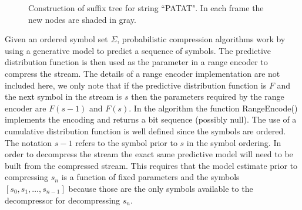 \newcommand{\T}{\ensuremath{\mathcal{T}}}
\newcommand{\N}{\ensuremath{\mathcal{N}}}
\newcommand{\M}{\ensuremath{\mathcal{M}}}
\newcommand{\PP}{\ensuremath{\mathcal{P}}}
\newcommand{\nc}{\ensuremath{nc}}
\newcommand{\RS}{\ensuremath{\mathcal{R}\mathcal{S}}}
\newcommand{\D}{\ensuremath{\mathcal{D}}}
\newcommand{\la}{\ensuremath{\leftarrow}}
\newcommand{\G}{\ensuremath{\mathcal{G}}}
\newcommand{\IS}{\ensuremath{\mathcal{I}\mathcal{S}}}
\newcommand{\Seq}{\ensuremath{\mathcal{S}}}

\begin{figure}[t] 
	\begin{center}
		\caption{Construction of suffix tree for string ``PATAT".  In each frame the new nodes are shaded in gray.}
		\label{fig:suffix_tree}
	\end{center} 
\end{figure} 

Given an ordered symbol set $\Sigma$, probabilistic compression algorithms work by using a generative model to predict a sequence of symbols.   The predictive distribution function is then used as the parameter in a range encoder to compress the stream. The details of a range encoder implementation are not included here, we only note that if the predictive distribution function is $F$ and the next symbol in the stream is $s$ then the parameters required by the range encoder are $F(s-1)$ and $F(s)$. In the algorithm the function RangeEncode() implements the encoding and returns a bit sequence (possibly null).  The use of a cumulative distribution function is well defined since the symbols are ordered.  The notation $s-1$ refers to the symbol prior to $s$ in the symbol ordering.  In order to decompress the stream the exact same predictive model will need to be built from the compressed stream.  This requires that the model estimate prior to compressing $s_n$ is a function of fixed parameters and the symbols $[s_0, s_1, \ldots, s_{n-1}]$ because those are the only symbols available to the decompressor for decompressing $s_n$.  

